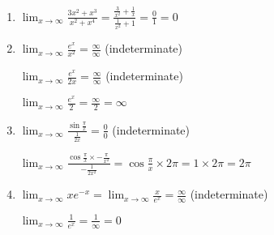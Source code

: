 \documentclass[../main.tex]{subfiles}
\begin{document}
\begin{spacing}{2}
\begin{enumerate}[itemsep=0.7cm]
    \item 
    $\displaystyle \lim_{x\rightarrow \infty}\frac{3x^2+x^3}{x^2+x^4}=\frac{\frac{3}{x^2}+\frac{1}{x}}{\frac{1}{x^2}+1}=\frac{0}{1}=0$

    \item 
    $\displaystyle \lim_{x\rightarrow \infty}\frac{e^x}{x^2}=\frac{\infty}{\infty}$ (indeterminate)

    $\displaystyle \lim_{x\rightarrow \infty}\frac{e^x}{2x}=\frac{\infty}{\infty}$ (indeterminate)

    $\displaystyle \lim_{x\rightarrow \infty}\frac{e^x}{2}=\frac{\infty}{2}=\infty$

    \item 
    $\displaystyle \lim_{x\rightarrow \infty}\frac{\sin{\frac{\pi}{x}}}{\frac{1}{2x}}=\frac{0}{0}$ (indeterminate)

    $\displaystyle \lim_{x\rightarrow \infty}\frac{\cos{\frac{\pi}{x}}\times -\frac{\pi}{x^2}}{-\frac{1}{2x^2}}=\cos{\frac{\pi}{x}}\times 2\pi=1\times 2\pi=2\pi$

    \item 
    $\displaystyle \lim_{x\rightarrow \infty}x e^{-x}=\lim_{x\rightarrow \infty}\frac{x}{e^x}=\frac{\infty}{\infty}$ (indeterminate)

    $\displaystyle \lim_{x\rightarrow \infty}\frac{1}{e^x}=\frac{1}{\infty}=0$


    
\end{enumerate}
\end{spacing}
\end{document}
